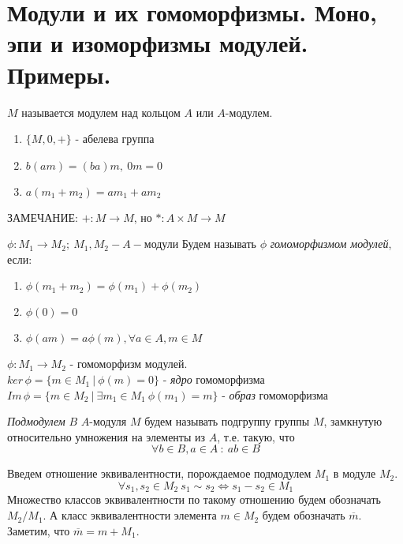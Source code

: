 \section{Модули и их гомоморфизмы. Моно, эпи и изоморфизмы модулей. Примеры.}

\begin{defn}
  $ M $ называется модулем над кольцом $ A $ или $A$-модулем.
  \begin{enumerate}
    \item $ \{M, 0, +\} $ - абелева группа
    \item $ b(am) = (ba)m, ~ 0m = 0 $
    \item $ a(m_1 + m_2) = am_1 + am_2 $
  \end{enumerate}
\end{defn}

ЗАМЕЧАНИЕ: $ + : M \rightarrow M $, но $ \ast : A \times M \rightarrow M $

\begin{defn}
  $ \phi : M_{1} \rightarrow M_{2} ;~  M_1, M_2 - A-$модули \newline
  Будем называть $ \phi $ \emph{гомоморфизмом модулей}, если:
  \begin{enumerate}
    \item $ \phi(m_1+m_2) = \phi(m_1) + \phi(m_2) $
    \item $ \phi(0) = 0 $
    \item $ \phi(am) = a\phi(m), \forall a \in A, m \in M $
  \end{enumerate}
\end{defn}

\begin{defn}
  $ \phi : M_1 \rightarrow M_2 $ - гомоморфизм модулей. \\
  $ ker \, \phi = \{ m \in M_1 ~ | ~ \phi(m) = 0 \} $ - \emph{ядро} гомоморфизма\\
  $ Im \, \phi = \{ m \in M_2 ~ | ~ \exists m_1 \in M_1 ~ \phi(m_1) = m \} $ - \emph{образ} гомоморфизма
\end{defn}

\begin{defn}
  \emph{Подмодулем} $ B $ $A$-модуля $ M $ будем называть подгруппу группы $ M $, замкнутую
  относительно умножения на элементы из $ A $, т.е. такую, что 
  \[ \forall b \in B, a \in A ~ : ~ ab \in B \]
\end{defn}

Введем отношение эквивалентности, порождаемое подмодулем $ M_1 $ в модуле $ M_2 $. 
\[ \forall s_1, s_2 \in M_2 ~ s_1 \sim s_2 \Leftrightarrow s_1 - s_2 \in M_1 \]
Множество классов эквивалентности по такому отношению будем обозначать $ M_2/M_1 $.
А класс эквивалентности элемента $ m \in M_2 $ будем обозначать $ \overline{m} $.
Заметим, что $ \overline{m} = m + M_1 $.

